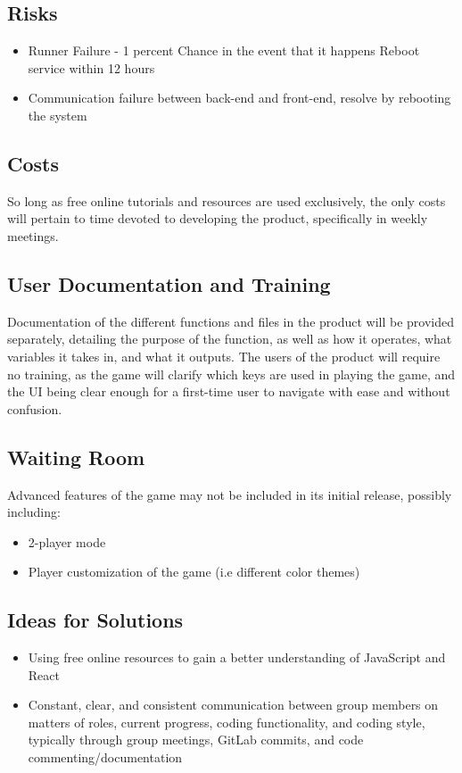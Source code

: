 \documentclass[12pt, titlepage]{article}
\begin{document}
\subsection{Risks}
\begin{itemize}
    \item Runner Failure - 1 percent Chance in the event that it happens Reboot service within 12 hours
    \item Communication failure between back-end and front-end, resolve by rebooting the system
\end{itemize}

\subsection{Costs}
So long as free online tutorials and resources are used exclusively, the only costs will pertain to time devoted to developing the product, specifically in weekly meetings.

\subsection{User Documentation and Training}
Documentation of the different functions and files in the product will be provided separately, detailing the purpose of the function, as well as how it operates, what variables it takes in, and what it outputs. 
The users of the product will require no training, as the game will clarify which keys are used in playing the game, and the UI being clear enough for a first-time user to navigate with ease and without confusion.

\subsection{Waiting Room}
Advanced features of the game may not be included in its initial release, possibly including:
\begin{itemize}
    \item 2-player mode
    \item Player customization of the game (i.e different color themes)
\end{itemize}

\subsection{Ideas for Solutions}
\begin{itemize}
    \item Using free online resources to gain a better understanding of JavaScript and React
    \item Constant, clear, and consistent communication between group members on matters of roles, current progress, coding functionality, and coding style, typically through group meetings, GitLab commits, and code commenting/documentation
\end{itemize}
\end{document}
